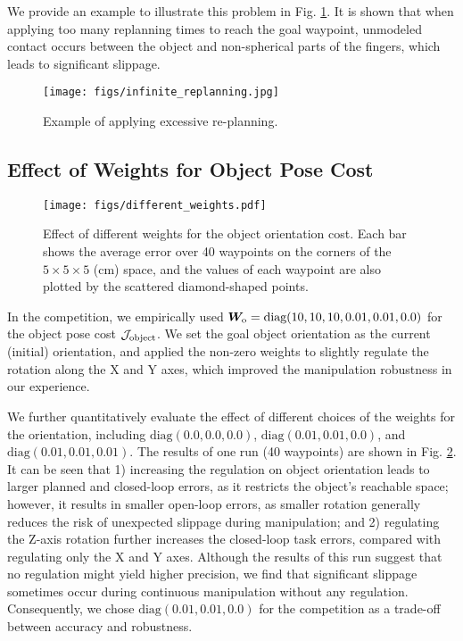{We provide an example to illustrate this problem in Fig. \ref{fig:infinite_replanning}. It is shown that when applying too many replanning times to reach the goal waypoint, unmodeled contact occurs between the object and non-spherical parts of the fingers, which leads to significant slippage.

\begin{figure} [tb]
  \centering 
    \texttt{[image: figs/infinite\_replanning.jpg]} 
  \caption{Example of applying excessive re-planning.}
  \label{fig:infinite_replanning}
\end{figure}

\subsection{Effect of Weights for Object Pose Cost}

\begin{figure} [tb]
  \centering 
    \texttt{[image: figs/different\_weights.pdf]} 
  \caption{Effect of different weights for the object orientation cost. Each bar shows the average error over 40 waypoints on the corners of the $5\times5\times5$ (cm) space, and the values of each waypoint are also plotted by the scattered diamond-shaped points.}
  \label{fig:different_weights}
\end{figure}

In the competition, we empirically used $\bm W_{\rm o} = \text{diag}(10, 10, 10, 0.01, 0.01, 0.0)$ for the object pose cost $\mathcal{J}_{\rm object}$. We set the goal object orientation as the current (initial) orientation, and applied the non-zero weights to slightly regulate the rotation along the X and Y axes, which improved the manipulation robustness in our experience.

We further quantitatively evaluate the effect of different choices of the weights for the orientation, including $\text{diag}(0.0, 0.0, 0.0)$, $\text{diag}(0.01, 0.01, 0.0)$, and $\text{diag}(0.01, 0.01, 0.01)$. The results of one run (40 waypoints) are shown in Fig. \ref{fig:different_weights}. 
It can be seen that 
1) increasing the regulation on object orientation leads to larger planned and closed-loop errors, as it restricts the object's reachable space; however, it results in smaller open-loop errors, as smaller rotation generally reduces the risk of unexpected slippage during manipulation;
and 2) regulating the Z-axis rotation further increases the closed-loop task errors, compared with regulating only the X and Y axes.
Although the results of this run suggest that no regulation might yield higher precision, we find that significant slippage sometimes occur during continuous manipulation without any regulation. 
Consequently, we chose $\text{diag}(0.01, 0.01, 0.0)$ for the competition as a trade-off between accuracy and robustness.



}
